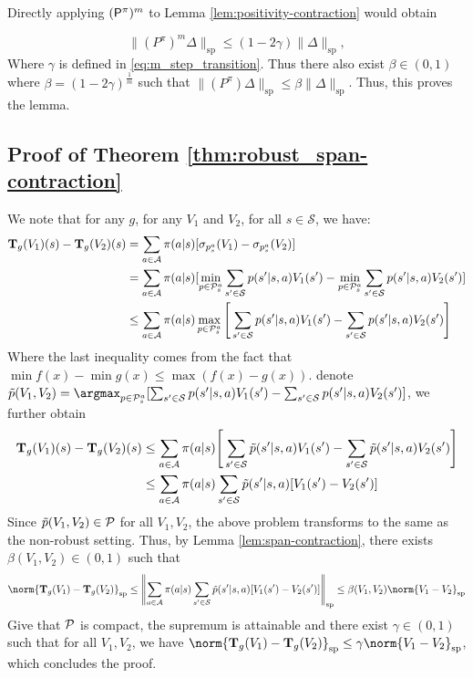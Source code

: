 Directly applying $(\mathsf P^\pi)^m$ to Lemma \ref{lem:positivity-contraction} would obtain

\begin{equation}
\|(P^\pi)^m \Delta\|_{\mathrm{sp}}\leq (1-2\gamma)\|\Delta\|_{\mathrm{sp}},
\end{equation}
Where $\gamma$ is defined in \eqref{eq:m_step_transition}.
Thus there also exist $\beta \in (0,1)$ where $\beta = (1-2\gamma)^{\frac{1}{m}}$ such that $\|(P^\pi) \Delta\|_{\mathrm{sp}}\leq \beta \|\Delta\|_{\mathrm{sp}}$.
Thus, this proves the lemma.

\subsection{Proof of Theorem \ref{thm:robust_span-contraction}} \label{proofrobust-span-contraction}

    We note that for any $g$, for any $V_1$ and $V_2$, for all $s \in \mathcal{S}$, we have:
    \begin{align}
         \mathbf{T}_g(V_1)(s) -  \mathbf{T}_g(V_2)(s) &= \sum_{a \in \mathcal{A}} \pi(a|s) [\sigma_{p^a_s}(V_1) -  \sigma_{p^a_s}(V_2)] \nonumber \\
        & = \sum_{a \in \mathcal{A}} \pi(a|s) [ \min_{p\in\mathcal{P}^a_s} \sum_{s' \in \mathcal{S}} p(s'|s,a)V_1(s') -   \min_{p\in\mathcal{P}^a_s} \sum_{s' \in \mathcal{S}} p(s'|s,a) V_2(s')] \nonumber \\
        & \leq  \sum_{a \in \mathcal{A}} \pi(a|s) \max_{p\in\mathcal{P}^a_s} \Bigg[ \sum_{s' \in \mathcal{S}} p(s'|s,a)V_1(s') -  \sum_{s' \in \mathcal{S}} p(s'|s,a) V_2(s') \Bigg] 
    \end{align}
    Where the last inequality comes from the fact that $\min f(x) - \min g(x) \leq \max (f(x)-g(x))$. denote $\Tilde{p} (V_1,V_2) = \argmax_{p\in\cp^a_s} [ \sum_{s' \in \mathcal{S}} p(s'|s,a)V_1(s') -  \sum_{s' \in \mathcal{S}} p(s'|s,a) V_2(s') ] $, we further obtain
    \begin{align}
         \mathbf{T}_g(V_1)(s) -  \mathbf{T}_g(V_2)(s) &\leq \sum_{a \in \mathcal{A}} \pi(a|s)  \Bigg[ \sum_{s' \in \mathcal{S}} \Tilde{p}(s'|s,a)V_1(s') -  \sum_{s' \in \mathcal{S}} \Tilde{p}(s'|s,a) V_2(s') \Bigg] \nonumber \\
        &\leq \sum_{a \in \mathcal{A}} \pi(a|s)  \sum_{s' \in \mathcal{S}} \Tilde{p}(s'|s,a)[V_1(s') - V_2(s')]
    \end{align}
Since $\Tilde{p}(V_1,V_2) \in \mathcal{P}$ for all $V_1, V_2$, the above problem transforms to the same as the non-robust setting. Thus, by Lemma \ref{lem:span-contraction}, there exists $\beta (V_1,V_2) \in (0,1)$ such that 
\begin{equation}
    \norm{ \mathbf{T}_g(V_1) -  \mathbf{T}_g(V_2) }_{\mathrm{sp}} \leq  \bignorm{\sum_{a \in \mathcal{A}} \pi(a|s)  \sum_{s' \in \mathcal{S}} \Tilde{p}(s'|s,a)[V_1(s') - V_2(s')] }_{\mathrm{sp}} \leq \beta (V_1,V_2)\norm{V_1 - V_2}_{\mathrm{sp}}
\end{equation}
Give that $\mathcal{P}$ is compact, the supremum is attainable and there exist $\gamma \in (0,1)$ such that for all $V_1, V_2$, we have $\norm{  \mathbf{T}_g(V_1) -  \mathbf{T}_g(V_2) }_{\mathrm{sp}} \leq \gamma\norm{V_1 - V_2}_{\mathrm{sp}}$, which concludes the proof.

